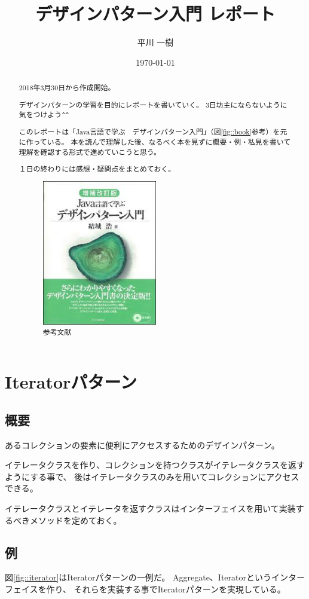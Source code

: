 \documentclass{jsarticle}
\title{デザインパターン入門 レポート}
\author{平川 一樹}
\date{\today}
\begin{document}
	\maketitle
	
	\begin{abstract}
		2018年3月30日から作成開始。
		
		デザインパターンの学習を目的にレポートを書いていく。
		3日坊主にならないように気をつけよう\verb|^^|
		
		このレポートは「Java言語で学ぶ　デザインパターン入門」（図\ref{fig::book}参考）を元に作っている。
		本を読んで理解した後、なるべく本を見ずに概要・例・私見を書いて理解を確認する形式で進めていこうと思う。
		
		１日の終わりには感想・疑問点をまとめておく。
		\begin{figure}[htbp]
			\centering
			\includegraphics[width = 5cm, bb = 0 0 199 253]{book.jpg}
			\caption{参考文献}\label{fig::book}
		\end{figure}
	\end{abstract}
	
	\section{Iteratorパターン}
	\subsection{概要}
		あるコレクションの要素に便利にアクセスするためのデザインパターン。
		
		イテレータクラスを作り、コレクションを持つクラスがイテレータクラスを返すようにする事で、
		後はイテレータクラスのみを用いてコレクションにアクセスできる。
		
		イテレータクラスとイテレータを返すクラスはインターフェイスを用いて実装するべきメソッドを定めておく。
	\subsection{例}
		図\ref{fig::iterator}はIteratorパターンの一例だ。
		Aggregate、Iteratorというインターフェイスを作り、
		それらを実装する事でIteratorパターンを実現している。
		
\end{document}
